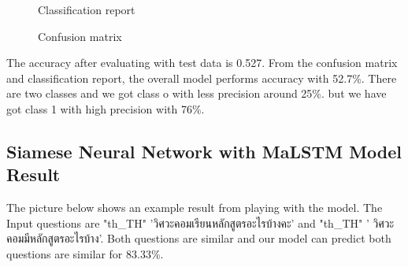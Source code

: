 \documentclass[12pt,oneside,openright,a4paper]{cpe-english-project}
\begin{document}
\begin{figure}[!h]\centering
\setlength{\fboxrule}{0.2mm} %
\setlength{\fboxsep}{1cm}
\caption{Classification report}\label{fig:Classification report}
\end{figure}
\begin{figure}[!h]\centering
\setlength{\fboxrule}{0.2mm} %
\setlength{\fboxsep}{1cm}
\caption{Confusion matrix}\label{fig:Confusion matrix}
\end{figure}

The accuracy after evaluating with test data is 0.527. From the confusion matrix and classification report, the overall model performs accuracy with 52.7\%. There are two classes and we got class o with less precision around 25\%. but we have got class 1 with high precision with 76\%.
\subsection{Siamese Neural Network with MaLSTM Model Result}

The picture below shows an example result from playing with the model. The Input questions are
{
\XeTeXlinebreaklocale "th_TH"	
\thaifont 
'วิศวะคอมเรียนหลักสูตรอะไรบ้างคะ' }
and
{
\XeTeXlinebreaklocale "th_TH"	
\thaifont 
 ' วิศวะคอมมีหลักสูตรอะไรบ้าง'. 
}Both questions are similar and our model can predict both questions are similar for 83.33\%.
\end{document}
